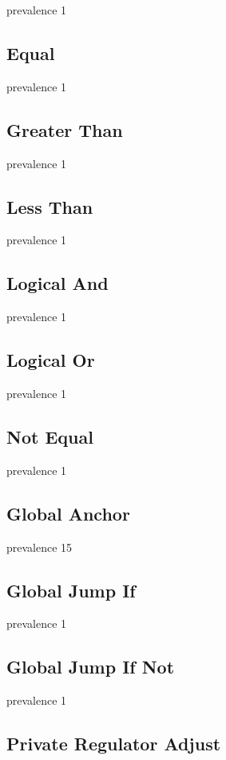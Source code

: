 prevalence 1

\subsection{Equal}

prevalence 1

\subsection{Greater Than}

prevalence 1

\subsection{Less Than}

prevalence 1

\subsection{Logical And}

prevalence 1


\subsection{Logical Or}

prevalence 1

\subsection{Not Equal}

prevalence 1

\subsection{Global Anchor}

prevalence 15

\subsection{Global Jump If}

prevalence 1

\subsection{Global Jump If Not}

prevalence 1

\subsection{Private Regulator Adjust}

